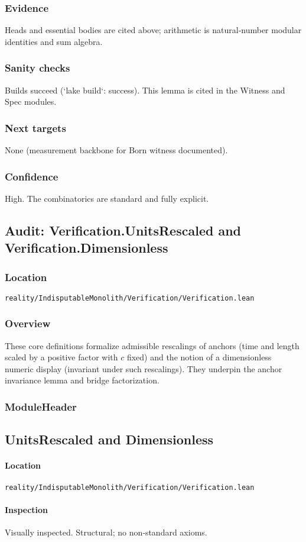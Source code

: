 \documentclass{article}
\newcommand{\FileRef}[1]{\texttt{#1}}
\newcommand{\ModuleHeader}[3]{%
  \subsection{#1}
  \paragraph{Location} \FileRef{#2}\\
  \paragraph{Inspection} #3
}
\begin{document}
\subsubsection{Evidence}
Heads and essential bodies are cited above; arithmetic is natural‑number modular identities and sum algebra.

\subsubsection{Sanity checks}
Builds succeed (`lake build`: success). This lemma is cited in the Witness and Spec modules.

\subsubsection{Next targets}
None (measurement backbone for Born witness documented).

\subsubsection{Confidence}
High. The combinatorics are standard and fully explicit.

\subsection{Audit: Verification.UnitsRescaled and Verification.Dimensionless}
\subsubsection{Location}
\FileRef{reality/IndisputableMonolith/Verification/Verification.lean}

\subsubsection{Overview}
These core definitions formalize admissible rescalings of anchors (time and length scaled by a positive factor with \(c\) fixed) and the notion of a dimensionless numeric display (invariant under such rescalings). They underpin the anchor invariance lemma and bridge factorization.

\subsubsection{ModuleHeader}
\ModuleHeader{UnitsRescaled and Dimensionless}{reality/IndisputableMonolith/Verification/Verification.lean}{Visually inspected. Structural; no non‑standard axioms.}
\end{document}
